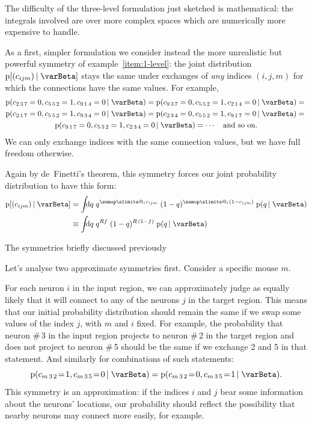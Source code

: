 \documentclass[\ifafour a4paper,12pt,\else a5paper,10pt,\fi%
onecolumn,oneside,article,%
british%
]{memoir}
\makeatletter
\theoremstyle{remark}
\theoremstyle{innote}
\def\sum{\DOTSI\sumop\slimits@}
\newcommand*{\di}{\mathrm{d}}%
\newcommand*{\pf}{\mathrm{p}}%
\renewcommand*{\|}[1][]{\nonscript\,#1\vert\nonscript\;\mathopen{}}
\newcommand*{\yI}{\varBeta}
\newcommand*{\yc}{c}
\newcommand*{\eq}{\mathrel{\!=\!}}
\makeatother
\begin{document}
\bigskip

The difficulty of the three-level formulation just sketched is
mathematical: the integrals involved are over more complex spaces which are
numerically more expensive to handle.

As a first, simpler formulation we consider instead the more unrealistic
but powerful symmetry of example~\ref{item:1-level}: the joint distribution
$\pf[(\yc_{ijm}) \| \yI]$ stays the same under exchanges of \emph{any}
indices $(i,j,m)$ for which the connections have the same values. For example,
\begin{multline}
  \label{eq:example_exchange_i}
  \pf(\yc_{2\,3\,7}=0, \yc_{5\,5\,2}=1, \yc_{9\,1\,4}=0 \| \yI) =
  \pf(\yc_{9\,3\,7}=0, \yc_{5\,5\,2}=1, \yc_{2\,1\,4}=0 \| \yI) ={}\\
  \pf(\yc_{2\,1\,7}=0, \yc_{5\,5\,2}=1, \yc_{9\,3\,4}=0 \| \yI) =
  \pf(\yc_{2\,3\,4}=0, \yc_{5\,5\,2}=1, \yc_{9\,1\,7}=0 \| \yI) ={}\\
  \pf(\yc_{9\,1\,7}=0, \yc_{5\,5\,2}=1, \yc_{2\,3\,4}=0 \| \yI) =
  \dotsb\quad\text{and so on.}
\end{multline}
We can only exchange indices with the same connection values, but
we have full freedom otherwise.

Again by de~Finetti's theorem, this symmetry forces our joint probability
distribution to have this form:
\begin{equation}
  \label{eq:definetti_1level}
  \begin{split}
  \pf[(\yc_{ijm}) \| \yI] &=
  \int\!\!\!\di q\;
  q^{\sum_{i}\yc_{ijm}}\;(1-q)^{\sum_{i}(1-\yc_{ijm})}\;
  \pf(q \| \yI)
\\ &\equiv
  \int\!\!\!\di q\;
  q^{R f}\;(1-q)^{R\,(1-f)}\;
  \pf(q \| \yI)
\end{split}
\end{equation}




The symmetries briefly discussed previously

Let's analyse two approximate symmetries first. Consider a specific mouse
$m$.

For each neuron $i$ in the input region, we can approximately judge as
equally likely that it will connect to any of the neurons $j$ in the target
region. This means that our initial probability distribution should remain
the same if we swap some values of the index $j$, with $m$ and $i$ fixed.
For example, the probability that neuron \#\,3 in the input region projects
to neuron \#\,2 in the target region and does not project to neuron \#\,5
should be the same if we exchange 2 and 5 in that statement. And similarly
for combinations of such statements:
\begin{equation}
  \label{eq:example_exch_j}
  \pf(\yc_{m\,3\,2} \eq 1, \yc_{m\,3\,5} \eq 0 \| \yI )
=  \pf(\yc_{m\,3\,2} \eq 0, \yc_{m\,3\,5} \eq 1 \| \yI ).
\end{equation}
This symmetry is an approximation: if the indices $i$ and $j$ bear some
information about the neurons' locations, our probability should reflect
the possibility that nearby neurons may connect more easily, for example.
\end{document}
